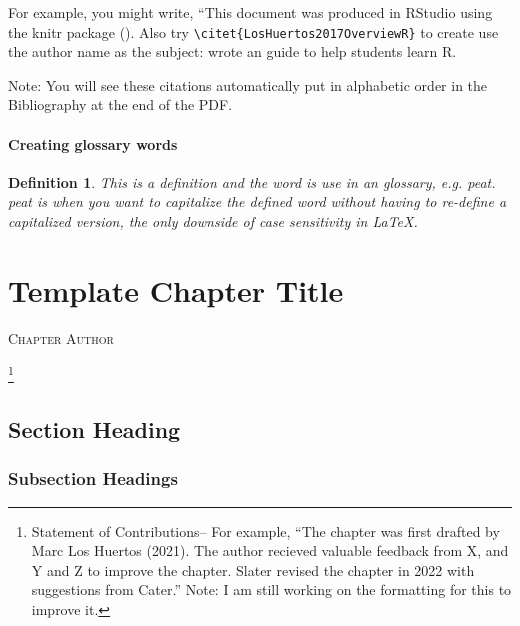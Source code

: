 \documentclass{book}\usepackage{knitr}
\makeatletter
\newtheorem{definition}[theorem]{Definition}
\newcommand{\chapterauthor}[1]{%
  {\parindent0pt\vspace*{-25pt}%
  \linespread{1.1}\large\scshape#1%
  \par\nobreak\vspace*{35pt}}
  \@afterheading%
}
\makeatother
\begin{document}
\begin{knitrout}
\begin{kframe}
For example, you might write, ``This document was produced in RStudio using the knitr package (\citep{knitr}). Also try \verb"\citet{LosHuertos2017OverviewR}" to create use the author name as the subject: \citet{LosHuertos2017OverviewR} wrote an guide to help students learn R. 

Note: You will see these citations automatically put in alphabetic order in the Bibliography at the end of the PDF. 


\subsubsection{Creating glossary words}
 

\begin{definition}
This is a definition and the word is use in an glossary, e.g. \gls{peat}. \Gls{peat} is when you want to capitalize the defined word without having to re-define a capitalized version, the only downside of case sensitivity in \LaTeX.
\end{definition}


\chapter{Template Chapter Title}\label{ch:template}

\chapterauthor{Chapter Author}

\footnote{Statement of Contributions-- For example, ``The chapter was first drafted by Marc Los Huertos (2021). The author recieved valuable feedback from X, and Y and Z to improve the chapter. Slater revised the chapter in 2022 with suggestions from Cater.'' Note: I am still working on the formatting for this to improve it.}

\section{Section Heading}%

\subsection{Subsection Headings} %


\end{kframe}
\end{knitrout}
\end{document}
